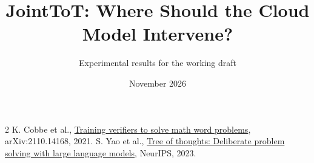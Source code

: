 \documentclass[10pt,twocolumn]{article}
\title{JointToT: Where Should the Cloud Model Intervene?}
\author{Experimental results for the working draft}
\date{November 2026}
\begin{document}
\maketitle

\begin{thebibliography}{2}\small
{} K. Cobbe et al., \href{https://arxiv.org/abs/2110.14168}{Training verifiers to solve math word problems}, arXiv:2110.14168, 2021.
 S. Yao et al., \href{https://arxiv.org/abs/2305.10601}{Tree of thoughts: Deliberate problem solving with large language models}, NeurIPS, 2023.
\end{thebibliography}
\end{document}
